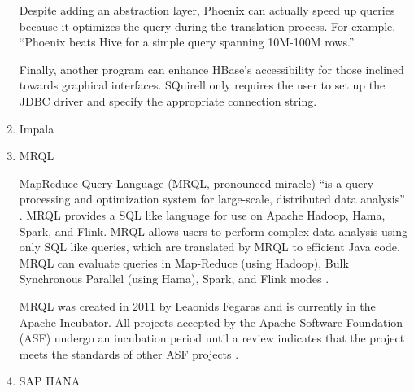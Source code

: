 \begin{enumerate}
Despite adding an abstraction layer, Phoenix can actually speed
up queries because it optimizes the query during the translation
process. \label{\detokenize{i524/technologies:id221}}{\hyperref[\detokenize{i524/technologies:www-phoenix-cloudera}]{\sphinxcrossref{{[}182{]}}}} For example, ``Phoenix
beats Hive for a simple query spanning 10M-100M rows.''
\label{\detokenize{i524/technologies:id222}}{\hyperref[\detokenize{i524/technologies:www-phoenix-infoq}]{\sphinxcrossref{{[}186{]}}}}

Finally, another program can enhance HBase's accessibility for
those inclined towards graphical interfaces.  SQuirell only
requires the user to set up the JDBC driver and specify the
appropriate connection string. \label{\detokenize{i524/technologies:id223}}{\hyperref[\detokenize{i524/technologies:www-phoenix-bighadoop}]{\sphinxcrossref{{[}187{]}}}}

\item {} 
Impala

\item {} 
MRQL

MapReduce Query Language (MRQL, pronounced miracle) ``is a query
processing and optimization system for large-scale, distributed
data analysis'' \label{\detokenize{i524/technologies:id224}}{\hyperref[\detokenize{i524/technologies:www-apachemrql}]{\sphinxcrossref{{[}188{]}}}}. MRQL provides a SQL
like language for use on Apache Hadoop, Hama, Spark, and Flink.
MRQL allows users to perform complex data analysis using only SQL
like queries, which are translated by MRQL to efficient Java
code. MRQL can evaluate queries in Map-Reduce (using Hadoop), Bulk
Synchronous Parallel (using Hama), Spark, and Flink modes
\label{\detokenize{i524/technologies:id225}}{\hyperref[\detokenize{i524/technologies:www-apachemrql}]{\sphinxcrossref{{[}188{]}}}}.

MRQL was created in 2011 by Leaonids
Fegaras \label{\detokenize{i524/technologies:id226}}{\hyperref[\detokenize{i524/technologies:www-mrqlhadoop}]{\sphinxcrossref{{[}189{]}}}} and is currently in the Apache
Incubator.  All projects accepted by the Apache Software
Foundation (ASF) undergo an incubation period until a review
indicates that the project meets the standards of other ASF
projects \label{\detokenize{i524/technologies:id227}}{\hyperref[\detokenize{i524/technologies:www-apacheincubator}]{\sphinxcrossref{{[}190{]}}}}.

\item {} 
SAP HANA


\end{enumerate}

